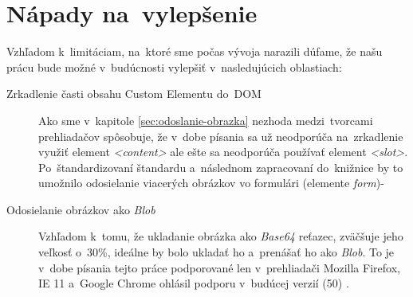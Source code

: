 \section{Nápady na~vylepšenie}

Vzhľadom k~limitáciam, na~ktoré sme počas vývoja narazili dúfame, že našu prácu bude možné v~budúcnosti vylepšiť v~nasledujúcich oblastiach:

\begin{description}
	
	\item[Zrkadlenie časti obsahu Custom Elementu do~DOM] Ako sme v~kapitole \ref{sec:odoslanie-obrazka} nezhoda medzi~tvorcami prehliadačov spôsobuje, že v~dobe písania sa už neodporúča na~zrkadlenie využiť element \emph{<content>} ale ešte sa neodporúča používať element \emph{<slot>}. Po~štandardizovaní štandardu a~následnom zapracovaní do~knižnice by to umožnilo odosielanie viacerých obrázkov vo formulári (elemente \emph{form})-
	
	\item[Odosielanie obrázkov ako \emph{Blob}] Vzhľadom k~tomu, že ukladanie obrázka ako \emph{Base64} reťazec, zväčšuje jeho veľkosť o~30\%, ideálne by bolo ukladať ho a~prenášať ho ako \emph{Blob}. To je v~dobe písania tejto práce podporované len v~prehliadači Mozilla Firefox, IE 11 a~Google Chrome ohlásil podporu v~budúcej verzií (50) \cite{Canvas_toBlob}.
	
\end{description}